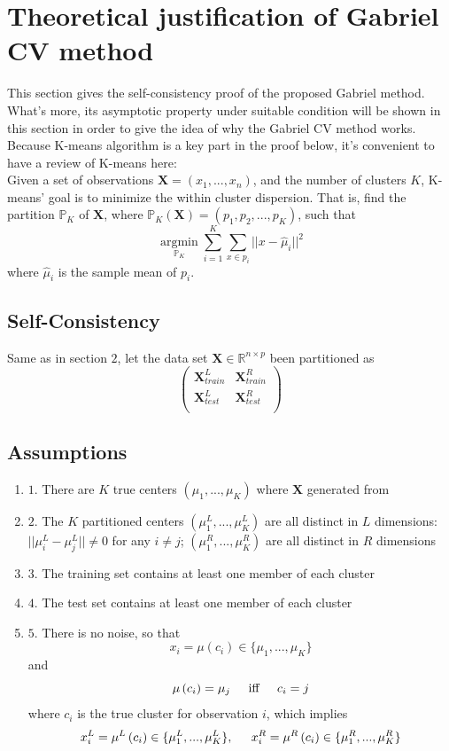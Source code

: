 \documentclass[11pt]{article}
\begin{document}
\section{Theoretical justification of Gabriel CV method}
This section gives the self-consistency proof of the proposed Gabriel method. What's more, its asymptotic property under suitable condition will be shown in this section in order to give the idea of why the Gabriel CV method works.\\

Because K-means algorithm is a key part in the proof below, it's convenient to have a review of K-means here:\\
Given a set of observations $\mathbf{X} = (x_1,...,x_n)$, and the number of clusters $K$, K-means' goal is to minimize the within cluster dispersion. That is, find the partition $\mathbb{P}_K$ of $\mathbf{X}$, where $\mathbb{P}_K(\mathbf{X})= (p_1,p_2,...,p_K)$, such that
\[	\underset{\mathbb{P}_K}{\operatorname{argmin}} \sum^K_{i=1}\sum_{x \in p_i } ||x-\hat{\mu}_i||^2\]
where $\hat{\mu}_i$ is the sample mean of $p_i$.
\subsection{Self-Consistency}
Same as in section $2$, let the data set $\mathbf{X} \in \mathbb{R}^{n \times p}$ been partitioned as 
 \[ 
 \begin{pmatrix}
\mathbf{X}^L_{train} & \mathbf{X}^R_{train}\\
  \mathbf{X}^L_{test}  & \mathbf{X}^R_{test}\\
  \end{pmatrix}
 \]
\subsection*{Assumptions}
\begin{enumerate}[label={Assumption},leftmargin=*]
\item $1.$ There are $K$ true centers $(\mu_1,...,\mu_K)$ where $\mathbf{X}$ generated from
\item $2.$ The $K$ partitioned centers $(\mu^L_1,...,\mu^L_K)$ are all distinct in $L$ dimensions: $||\mu^L_i-\mu^L_j|| \neq 0$ for any $i \neq j$; $(\mu^R_1,...,\mu^R_K)$ are all distinct in $R$ dimensions
\item $3.$ The training set contains at least one member of each cluster
\item $4.$ The test set contains at least one member of each cluster
\item $5.$ There is no noise, so that $$x_i = \mu \left(c_i\right) \in \{\mu_1,...,\mu_K\} $$ and $$\mu \left(c_i\right) = \mu_j \hspace{0.2in} \text{iff} \hspace{0.2in} c_i = j$$ where $c_i$ is the true cluster for observation $i$, which implies $$x^L_i = \mu^L\left(c_i\right) \in \{\mu^L_1,...,\mu^L_K\},\hspace{0.2in} x^R_i = \mu^R\left(c_i\right) \in \{\mu^R_1,...,\mu^R_K\}$$
\end{enumerate}
 
\end{document}
